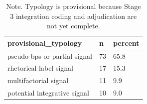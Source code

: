 \begin{table}[htbp]
\raggedright
\caption{Primary Research Question 1. Provisional typology of BPS operationalization.}
\label{tab.bps.typology}
\begin{tabular}{lll}
\toprule
provisional\_typology & n & percent \\
\midrule
pseudo-bps or partial signal & 73 & 65.8 \\
rhetorical label signal & 17 & 15.3 \\
multifactorial signal & 11 & 9.9 \\
potential integrative signal & 10 & 9.0 \\
\bottomrule
\end{tabular}

\caption*{Note. Typology is provisional because Stage 3 integration coding and adjudication are not yet complete.}
\end{table}
